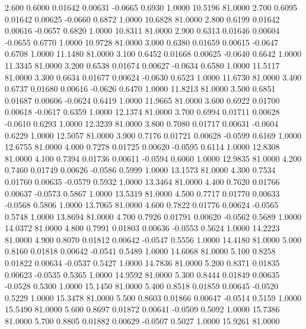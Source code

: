    2.600   0.6000   0.01642   0.00631  -0.0665   0.6930   1.0000  10.5196  81.0000
   2.700   0.6095   0.01642   0.00625  -0.0660   0.6872   1.0000  10.6828  81.0000
   2.800   0.6199   0.01642   0.00616  -0.0657   0.6820   1.0000  10.8311  81.0000
   2.900   0.6313   0.01646   0.00604  -0.0655   0.6770   1.0000  10.9728  81.0000
   3.000   0.6380   0.01659   0.00615  -0.0647   0.6708   1.0000  11.1480  81.0000
   3.100   0.6452   0.01668   0.00625  -0.0640   0.6642   1.0000  11.3345  81.0000
   3.200   0.6538   0.01674   0.00627  -0.0634   0.6580   1.0000  11.5117  81.0000
   3.300   0.6634   0.01677   0.00624  -0.0630   0.6523   1.0000  11.6730  81.0000
   3.400   0.6737   0.01680   0.00616  -0.0626   0.6470   1.0000  11.8213  81.0000
   3.500   0.6851   0.01687   0.00606  -0.0624   0.6419   1.0000  11.9665  81.0000
   3.600   0.6922   0.01700   0.00618  -0.0617   0.6359   1.0000  12.1374  81.0000
   3.700   0.6994   0.01711   0.00628  -0.0610   0.6293   1.0000  12.3239  81.0000
   3.800   0.7080   0.01717   0.00631  -0.0604   0.6229   1.0000  12.5057  81.0000
   3.900   0.7176   0.01721   0.00628  -0.0599   0.6169   1.0000  12.6755  81.0000
   4.000   0.7278   0.01725   0.00620  -0.0595   0.6114   1.0000  12.8308  81.0000
   4.100   0.7394   0.01736   0.00611  -0.0594   0.6060   1.0000  12.9835  81.0000
   4.200   0.7460   0.01749   0.00626  -0.0586   0.5999   1.0000  13.1573  81.0000
   4.300   0.7534   0.01760   0.00635  -0.0579   0.5932   1.0000  13.3464  81.0000
   4.400   0.7620   0.01766   0.00637  -0.0573   0.5867   1.0000  13.5319  81.0000
   4.500   0.7717   0.01770   0.00633  -0.0568   0.5806   1.0000  13.7065  81.0000
   4.600   0.7822   0.01776   0.00624  -0.0565   0.5748   1.0000  13.8694  81.0000
   4.700   0.7926   0.01791   0.00620  -0.0562   0.5689   1.0000  14.0372  81.0000
   4.800   0.7991   0.01803   0.00636  -0.0553   0.5624   1.0000  14.2223  81.0000
   4.900   0.8070   0.01812   0.00642  -0.0547   0.5556   1.0000  14.4180  81.0000
   5.000   0.8160   0.01818   0.00642  -0.0541   0.5489   1.0000  14.6068  81.0000
   5.100   0.8258   0.01822   0.00634  -0.0537   0.5427   1.0000  14.7836  81.0000
   5.200   0.8371   0.01835   0.00623  -0.0535   0.5365   1.0000  14.9592  81.0000
   5.300   0.8444   0.01849   0.00635  -0.0528   0.5300   1.0000  15.1450  81.0000
   5.400   0.8518   0.01859   0.00645  -0.0520   0.5229   1.0000  15.3478  81.0000
   5.500   0.8603   0.01866   0.00647  -0.0514   0.5159   1.0000  15.5490  81.0000
   5.600   0.8697   0.01872   0.00641  -0.0509   0.5092   1.0000  15.7386  81.0000
   5.700   0.8805   0.01882   0.00629  -0.0507   0.5027   1.0000  15.9261  81.0000

